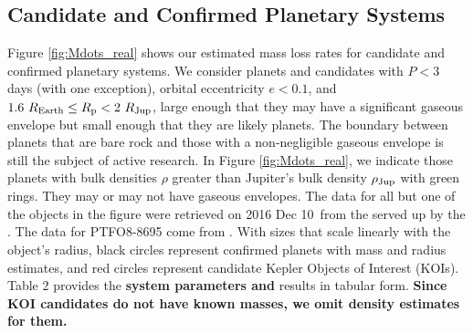 \documentclass{aastex}
\newcommand{\catalogretrievaldate}{2016 Dec 10}
\begin{document}
\subsection{Candidate and Confirmed Planetary Systems}
Figure \ref{fig:Mdots_real} shows our estimated mass loss rates for candidate and confirmed planetary systems. We consider planets and candidates with $P < 3$ days (with one exception), orbital eccentricity $e < 0.1$, and $1.6\ R_{\rm Earth} \le R_{\rm p} < 2\ R_{\rm Jup}$, large enough that they may have a significant gaseous envelope \citep{2015ApJ...801...41R} but small enough that they are likely planets. The boundary between planets that are bare rock and those with a non-negligible gaseous envelope is still the subject of active research. In Figure \ref{fig:Mdots_real}, we indicate those planets with bulk densities $\rho$ greater than Jupiter's bulk density $\rho_{\rm Jup} $ with green rings. They may or may not have gaseous envelopes. The data for all but one of the objects in the figure were retrieved on \catalogretrievaldate\ from the  served up by the . The data for PTFO8-8695 come from \citet{2013ApJ...774...53B}. With sizes that scale linearly with the object's radius, black circles represent confirmed planets with mass and radius estimates, and red circles represent candidate Kepler Objects of Interest (KOIs). Table 2 provides the {\bf system parameters and} results in tabular form. {\bf Since KOI candidates do not have known masses, we omit density estimates for them.}
\end{document}
